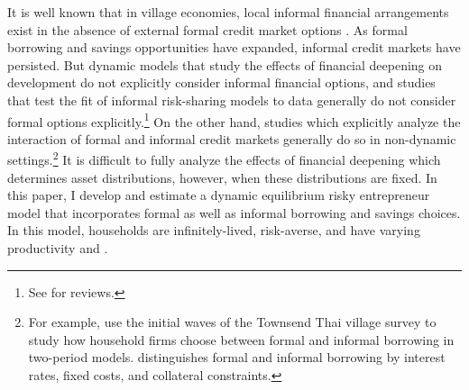 \newcommand{\introfootone}{For example, \textcite{gine_access_2011, KARAIVANOV2018100} use the initial waves of the Townsend Thai village survey to study how household firms choose between formal and informal borrowing in two-period models. \textcite{gine_access_2011} distinguishes formal and informal borrowing by interest rates, fixed costs, and collateral constraints.}

It is well known that in village economies, local informal financial arrangements exist in the absence of external formal credit market options \autocite{udry_risk_1994, townsend_risk_1994}. As formal borrowing and savings opportunities have expanded, informal credit markets have persisted. But dynamic models that study the effects of financial deepening on development do not explicitly consider informal financial options, and studies that test the fit of informal risk-sharing models to data generally do not consider formal options explicitly.\footnote{See \textcite{townsend_financial_2010, BKSannualReview} for reviews.} On the other hand, studies which explicitly analyze the interaction of formal and informal credit markets generally do so in non-dynamic settings.\footnote{\introfootone} It is difficult to fully analyze the effects of financial deepening which determines asset distributions, however, when these distributions are fixed. In this paper, I develop and estimate a dynamic equilibrium risky entrepreneur model that incorporates formal as well as informal borrowing and savings choices. In this model, households are infinitely-lived, risk-averse, and have varying productivity and \CZH. 
